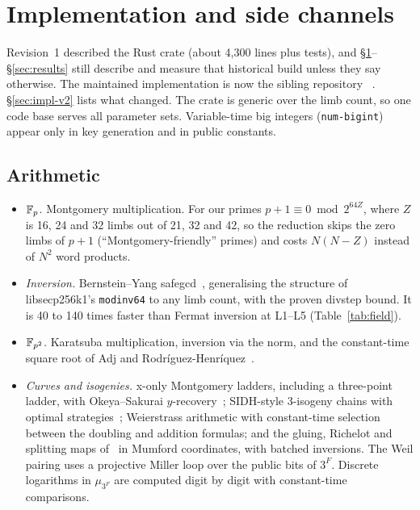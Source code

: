 \section{Implementation and side channels}\label{sec:impl}

Revision~1 described the Rust crate  (about 4,300
lines plus tests), and \S\ref{sec:impl}--\S\ref{sec:results} still describe
and measure that historical build unless they say otherwise. The maintained
implementation is now the sibling repository ~\cite{EigenX}.
\S\ref{sec:impl-v2} lists what changed. The crate is generic over the limb
count, so one code base serves all parameter sets. Variable-time big integers (\texttt{num-bigint}) appear only
in key generation and in public constants.

\subsection{Arithmetic}
\begin{itemize}
\item \emph{$\mathbb{F}_p$.} Montgomery multiplication. For our primes $p+1\equiv0
  \bmod 2^{64Z}$, where $Z$ is 16, 24 and 32 limbs out of 21, 32 and 42, so the
  reduction skips the zero limbs of $p+1$ (``Montgomery-friendly'' primes) and
  costs $N(N-Z)$ instead of $N^2$ word products.
\item \emph{Inversion.} Bernstein--Yang safegcd~\cite{BY19}, generalising the
  structure of libsecp256k1's \texttt{modinv64} to any limb count, with the
  proven divstep bound. It is 40 to 140 times faster than Fermat inversion
  at L1--L5 (Table~\ref{tab:field}).
\item \emph{$\mathbb{F}_{p^2}$.} Karatsuba multiplication, inversion via the norm,
  and the constant-time square root of Adj and Rodr\'iguez-Henr\'iquez~\cite{AR14}.
\item \emph{Curves and isogenies.} x-only Montgomery ladders, including a
  three-point ladder, with Okeya--Sakurai $y$-recovery~\cite{OS01}; SIDH-style
  3-isogeny chains with optimal strategies~\cite{CLN16}; Weierstrass
  arithmetic with constant-time selection between the doubling and addition
  formulas; and the gluing, Richelot and splitting maps of~\cite{CD23} in
  Mumford coordinates, with batched inversions. The Weil pairing uses a
  projective Miller loop over the public bits of $3^F$. Discrete logarithms in
  $\mu_{3^F}$ are computed digit by digit with constant-time comparisons.
\end{itemize}

